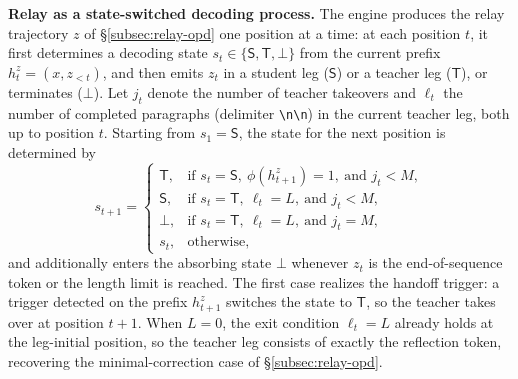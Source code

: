 \documentclass{article} %
\begin{document}
\textbf{Relay as a state-switched decoding process.} The engine produces the relay trajectory $z$ of \S\ref{subsec:relay-opd} one position at a time: at each position $t$, it first determines a decoding state $s_t\in\{\mathsf{S},\mathsf{T},\bot\}$ from the current prefix $h_t^z=(x,z_{<t})$, and then emits $z_t$ in a student leg ($\mathsf{S}$) or a teacher leg ($\mathsf{T}$), or terminates ($\bot$). Let $j_t$ denote the number of teacher takeovers and $\ell_t$ the number of completed paragraphs (delimiter \texttt{\textbackslash n\textbackslash n}) in the current teacher leg, both up to position $t$. Starting from $s_1=\mathsf{S}$, the state for the next position is determined by
\begin{equation}
s_{t+1}=
\begin{cases}
\mathsf{T}, & \text{if } s_t=\mathsf{S},\ \phi(h_{t+1}^z)=1,\ \text{and } j_t<M,\\[2pt]
\mathsf{S}, & \text{if } s_t=\mathsf{T},\ \ell_t=L,\ \text{and } j_t<M,\\[2pt]
\bot, & \text{if } s_t=\mathsf{T},\ \ell_t=L,\ \text{and } j_t=M,\\[2pt]
s_t, & \text{otherwise},
\end{cases}
\label{eq:state-transition}
\end{equation}
and additionally enters the absorbing state $\bot$ whenever $z_t$ is the end-of-sequence token or the length limit is reached. The first case realizes the handoff trigger: a trigger detected on the prefix $h_{t+1}^z$ switches the state to $\mathsf{T}$, so the teacher takes over at position $t+1$. When $L=0$, the exit condition $\ell_t=L$ already holds at the leg-initial position, so the teacher leg consists of exactly the reflection token, recovering the minimal-correction case of \S\ref{subsec:relay-opd}.\par
\end{document}
